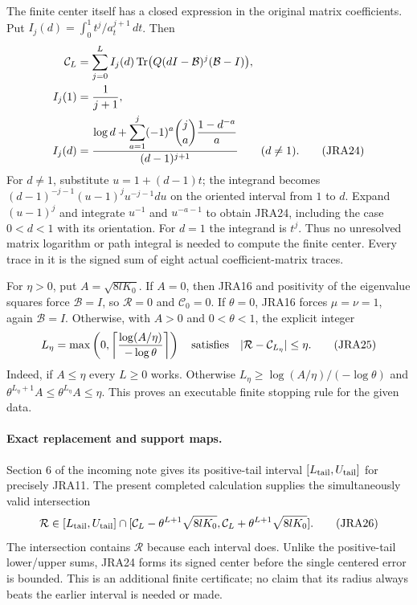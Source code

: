 The finite center itself has a closed expression in the original
matrix coefficients. Put $I_j(d)=\int_0^1t^j/a_t^{j+1}\,dt$. Then
\begin{align}
 \mathcal C_L
 &=\sum_{j=0}^L I_j(d)\operatorname{Tr}\bigl(Q(dI-\mathcal B)^j(\mathcal B-I)\bigr),\notag\\
 I_j(1)&=\frac1{j+1},\notag\\
 I_j(d)&=\frac{\displaystyle\log d+
       \sum_{a=1}^j(-1)^a\binom ja\frac{1-d^{-a}}a}
       {(d-1)^{j+1}}\qquad(d\ne1).
 \tag{JRA24}
\end{align}
For $d\ne1$, substitute $u=1+(d-1)t$; the integrand becomes
$(d-1)^{-j-1}(u-1)^ju^{-j-1}du$ on the oriented interval from $1$ to $d$.
Expand $(u-1)^j$ and integrate $u^{-1}$ and $u^{-a-1}$ to obtain JRA24,
including the case $0<d<1$ with its orientation. For $d=1$ the integrand
is $t^j$. Thus no unresolved matrix logarithm or path integral is needed
to compute the finite center. Every trace in it is the signed sum of
eight actual coefficient-matrix traces.

For $\eta>0$, put $A=\sqrt{8lK_0}$. If $A=0$, then JRA16 and positivity
of the eigenvalue squares force $\mathcal B=I$, so $\mathcal R=0$ and
$\mathcal C_0=0$. If $\theta=0$, JRA16 forces $\mu=\nu=1$, again
$\mathcal B=I$. Otherwise, with $A>0$ and $0<\theta<1$, the explicit
integer
\begin{equation}
 L_\eta=\max\left(0,
       \left\lceil\frac{\log(A/\eta)}{-\log\theta}\right\rceil\right)
 \quad\hbox{satisfies}\quad
 |\mathcal R-\mathcal C_{L_\eta}|\leq\eta.
 \tag{JRA25}
\end{equation}
Indeed, if $A\leq\eta$ every $L\geq0$ works. Otherwise
$L_\eta\geq\log(A/\eta)/(-\log\theta)$ and
$\theta^{L_\eta+1}A\leq\theta^{L_\eta}A\leq\eta$.
This proves an executable finite stopping rule for the given data.

\paragraph{Exact replacement and support maps.}
Section 6 of the incoming note gives its positive-tail interval
$[L_{\rm tail},U_{\rm tail}]$ for precisely JRA11. The present completed
calculation supplies the simultaneously valid intersection
\begin{equation}
 \mathcal R\in[L_{\rm tail},U_{\rm tail}]
 \cap[\mathcal C_L-\theta^{L+1}\sqrt{8lK_0},
       \mathcal C_L+\theta^{L+1}\sqrt{8lK_0}].
 \tag{JRA26}
\end{equation}
The intersection contains $\mathcal R$ because each interval does.
Unlike the positive-tail lower/upper sums, JRA24 forms its signed center
before the single centered error is bounded. This is an additional
finite certificate; no claim that its radius always beats the earlier
interval is needed or made.

